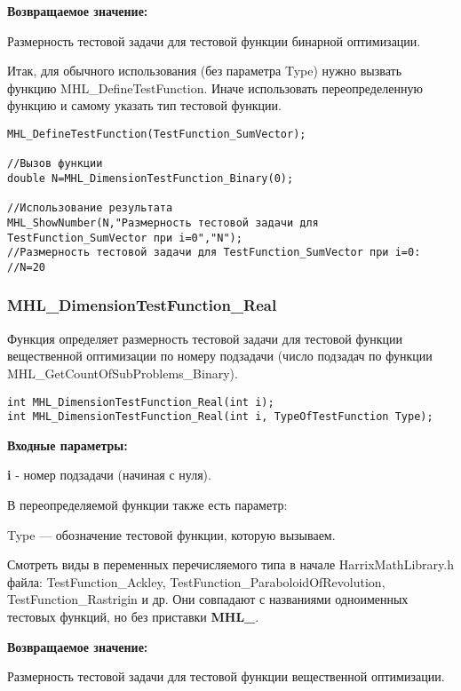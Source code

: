 \documentclass[a4paper,12pt]{article}
\begin{document}
\textbf{Возвращаемое значение:}
 
Размерность тестовой задачи для тестовой функции бинарной оптимизации.

Итак, для обычного использования (без параметра Type) нужно вызвать функцию MHL\_DefineTestFunction. Иначе использовать переопределенную функцию и самому указать тип тестовой функции.


\begin{lstlisting}[label=code_use_MHL_DimensionTestFunction_Binary,caption=Пример использования]
MHL_DefineTestFunction(TestFunction_SumVector);

//Вызов функции
double N=MHL_DimensionTestFunction_Binary(0);

//Использование результата
MHL_ShowNumber(N,"Размерность тестовой задачи для TestFunction_SumVector при i=0","N");
//Размерность тестовой задачи для TestFunction_SumVector при i=0:
//N=20
\end{lstlisting}

\subsubsection{MHL\_DimensionTestFunction\_Real}\label{MHL_DimensionTestFunction_Real}

Функция определяет размерность тестовой задачи для тестовой функции вещественной оптимизации по номеру подзадачи (число подзадач по функции MHL\_GetCountOfSubProblems\_Binary).


\begin{lstlisting}[label=code_syntax_MHL_DimensionTestFunction_Real,caption=Синтаксис]
int MHL_DimensionTestFunction_Real(int i);
int MHL_DimensionTestFunction_Real(int i, TypeOfTestFunction Type);
\end{lstlisting}

\textbf{Входные параметры:}

\textbf{i} - номер подзадачи (начиная с нуля).

В переопределяемой функции также есть параметр:
  
Type --- обозначение тестовой функции, которую вызываем. 

Смотреть виды в переменных перечисляемого типа в начале HarrixMathLibrary.h файла: TestFunction\_Ackley, TestFunction\_ParaboloidOfRevolution, TestFunction\_Rastrigin и др. Они совпадают с названиями одноименных тестовых функций, но без приставки \textbf{MHL\_}.

\textbf{Возвращаемое значение:}
 
Размерность тестовой задачи для тестовой функции вещественной оптимизации.
\end{document}
